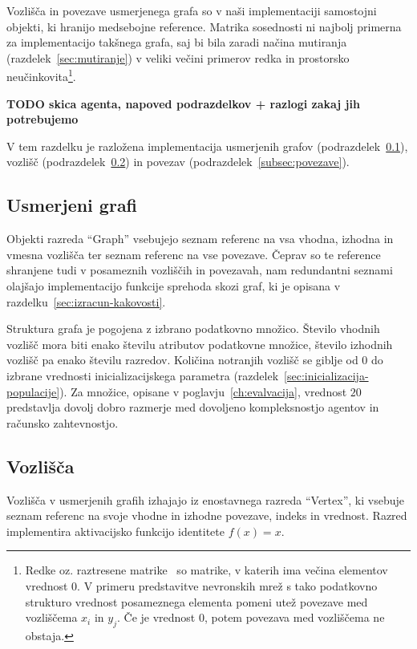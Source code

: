 \documentclass[a4paper,12pt,openright]{book}
\begin{document}
    Vozlišča in povezave usmerjenega grafa so v naši implementaciji samostojni objekti, ki hranijo medsebojne reference.
    Matrika sosednosti ni najbolj primerna za implementacijo takšnega grafa, saj bi bila zaradi načina mutiranja (razdelek~\ref{sec:mutiranje})
    v veliki večini primerov redka in prostorsko neučinkovita\footnote{Redke oz. raztresene matrike~\cite{enwiki:1196108633}
    so matrike, v katerih ima večina elementov vrednost 0.
    V primeru predstavitve nevronskih mrež s tako podatkovno strukturo vrednost posameznega elementa pomeni utež povezave
    med vozliščema $x_i$ in $y_j$.
    Če je vrednost 0, potem povezava med vozliščema ne obstaja.}.
    
    \textbf{TODO skica agenta, napoved podrazdelkov + razlogi zakaj jih potrebujemo}

    V tem razdelku je razložena implementacija usmerjenih grafov (podrazdelek~\ref{subsec:usmerjeni-grafi}),
    vozlišč (podrazdelek~\ref{subsec:vozlisca}) in povezav (podrazdelek~\ref{subsec:povezave}).


    \subsection{Usmerjeni grafi}\label{subsec:usmerjeni-grafi}
    Objekti razreda \enquote{Graph} vsebujejo seznam referenc na vsa vhodna, izhodna in vmesna vozlišča ter seznam referenc
    na vse povezave.
    Čeprav so te reference shranjene tudi v posameznih vozliščih in povezavah, nam redundantni seznami olajšajo
    implementacijo funkcije sprehoda skozi graf, ki je opisana v razdelku~\ref{sec:izracun-kakovosti}.

    Struktura grafa je pogojena z izbrano podatkovno množico.
    Število vhodnih vozlišč mora biti enako številu atributov podatkovne mno\-ži\-ce, šte\-vi\-lo izhodnih vozlišč pa enako številu razredov.
    Količina notranjih vozlišč se giblje od 0 do izbrane vrednosti inicializacijskega parametra (razdelek~\ref{sec:inicializacija-populacije}).
    Za množice, opisane v poglavju~\ref{ch:evalvacija}, vrednost $20$ predstavlja dovolj dobro razmerje med dovoljeno kompleksnostjo agentov in
    računsko zahtevnostjo.

    \subsection{Vozlišča}\label{subsec:vozlisca}
    Vozlišča v usmerjenih grafih izhajajo iz enostavnega razreda \enquote{Vertex}, ki vsebuje seznam referenc
    na svoje vhodne in izhodne povezave, indeks in vrednost.
    Razred implementira aktivacijsko funkcijo identitete $f(x)=x$.
\end{document}
